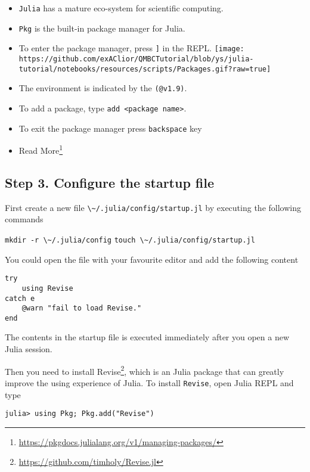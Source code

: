 \documentclass[
  notoc %
]{tufte-book}
\DeclareRobustCommand{\href}[2]{#2\footnote{\url{#1}}}
\providecommand{\tightlist}{%
  \setlength{\itemsep}{0pt}\setlength{\parskip}{0pt}
}
\newcommand{\passthrough}[1]{#1}
\begin{document}
\begin{itemize}
\tightlist
\item
  \passthrough{\lstinline!Julia!} has a mature eco-system for scientific
  computing.
\item
  \passthrough{\lstinline!Pkg!} is the built-in package manager for
  Julia.
\item
  To enter the package manager, press \passthrough{\lstinline!]!} in the
  REPL.
  \texttt{[image: https://github.com/exAClior/QMBCTutorial/blob/ys/julia-tutorial/notebooks/resources/scripts/Packages.gif?raw=true]}
\item
  The environment is indicated by the \passthrough{\lstinline!(@v1.9)!}.
\item
  To add a package, type \passthrough{\lstinline!add <package name>!}.
\item
  To exit the package manager press \passthrough{\lstinline!backspace!}
  key
\item
  \href{https://pkgdocs.julialang.org/v1/managing-packages/}{Read More}
\end{itemize}

\hypertarget{step-3.-configure-the-startup-file}{%
\subsection{Step 3. Configure the startup
file}\label{step-3.-configure-the-startup-file}}

First create a new file
\passthrough{\lstinline!\~/.julia/config/startup.jl!} by executing the
following commands

\passthrough{\lstinline!mkdir -r \~/.julia/config!}
\passthrough{\lstinline!touch \~/.julia/config/startup.jl!}

You could open the file with your favourite editor and add the following
content

\begin{lstlisting}
try
    using Revise
catch e
    @warn "fail to load Revise."
end
\end{lstlisting}

The contents in the startup file is executed immediately after you open
a new Julia session.

Then you need to install
\href{https://github.com/timholy/Revise.jl}{Revise}, which is an Julia
package that can greatly improve the using experience of Julia. To
install \passthrough{\lstinline!Revise!}, open Julia REPL and type

\begin{lstlisting}
julia> using Pkg; Pkg.add("Revise")
\end{lstlisting}
\end{document}
